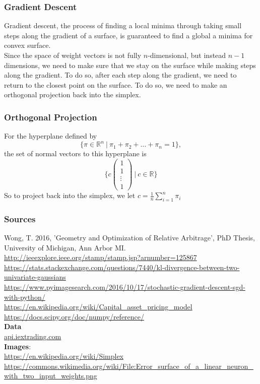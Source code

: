 \documentclass{beamer}
\begin{document}
\begin{frame}
\frametitle{Gradient Descent}
Gradient descent, the process of finding a local minima through taking small steps along the gradient of a surface, is guaranteed to find a global a minima for convex surface.  
\vspace{.1in}
\\Since the space of weight vectors is not fully $n$-dimensional, but instead $n-1$ dimensions, we need to make sure that we stay on the surface while making steps along the gradient.  To do so, after each step along the gradient, we need to return to the closest point on the surface.  To do so, we need to make an orthogonal projection back into the simplex.
\end{frame}

\begin{frame}
\frametitle{Orthogonal Projection}
For the hyperplane defined by
\[\{ \pi \in \mathbb{R}^n\ |\ \pi_1 + \pi_2 + \dots +\pi_n = 1\},\]
the set of normal vectors to this hyperplane is
\[\{c \begin{pmatrix}
1 \\ 1 \\ \vdots \\ 1 
\end{pmatrix}\ |\ c\in \mathbb{R}\}\]
So to project back into the simplex, we let $c = \frac{1}{n}\sum_{i=1}^n \pi_i$
\end{frame}



\begin{frame}
\frametitle{Sources}
Wong, T. 2016, 'Geometry and Optimization of Relative Arbitrage', PhD Thesis, University of Michigan, Ann Arbor MI.
\url{http://ieeexplore.ieee.org/stamp/stamp.jsp?arnumber=125867}
\\\url{https://stats.stackexchange.com/questions/7440/kl-divergence-between-two-univariate-gaussians}
\\\url{https://www.pyimagesearch.com/2016/10/17/stochastic-gradient-descent-sgd-with-python/}
\\\url{https://en.wikipedia.org/wiki/Capital_asset_pricing_model}
\\\url{https://docs.scipy.org/doc/numpy/reference/}
\\\textbf{Data}
\\\url{api.iextrading.com}
\\\textbf{Images}:
\\\url{https://en.wikipedia.org/wiki/Simplex}
\\\url{https://commons.wikimedia.org/wiki/File:Error_surface_of_a_linear_neuron_with_two_input_weights.png}
\end{frame}
\end{document}
